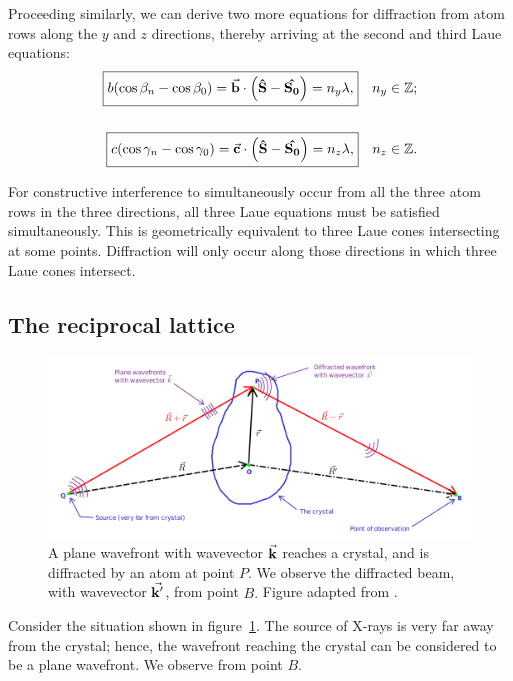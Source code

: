 	Proceeding similarly, we can derive two more equations for diffraction from atom rows along the $y$ and $z$ directions, thereby arriving at the second and third Laue equations:%
%		
	\begin{align}
	\boxed{b \qty( \cos \beta_n - \cos \beta_0 ) = \va{b} \cdot \qty( \vu{S} - \vu{S_0} ) = n_y \lambda,} \quad n_y \in \mathbb{Z}; \label{eq:2nd_laue_eqn} \\[1.5em]
	\boxed{c \qty( \cos \gamma_n - \cos \gamma_0 ) = \va{c} \cdot \qty( \vu{S} - \vu{S_0} ) = n_z \lambda,} \quad n_z \in \mathbb{Z}. \label{eq:3rd_laue_eqn}
	\end{align}
	
	For constructive interference to simultaneously occur from all the three atom rows in the three directions, all three Laue equations must be satisfied simultaneously. This is geometrically equivalent to three Laue cones intersecting at some points. Diffraction will only occur along those directions in which three Laue cones intersect.
	


\subsection{The reciprocal lattice}

	\begin{figure}
	\centering
	\includegraphics[width=\textwidth]{reciprocal_lattice.png}
	\caption{\label{fig:reciprocal_lattice}A plane wavefront with wavevector $\va{k}$ reaches a crystal, and is diffracted by an atom at point $P.$ We observe the diffracted beam, with wavevector $\va{k'}$, from point $B.$ Figure adapted from \cite{Harbola2021}.}
	\end{figure}

	Consider the situation shown in figure~\ref{fig:reciprocal_lattice}. The source of X-rays is very far away from the crystal; hence, the wavefront reaching the crystal can be considered to be a plane wavefront. We observe from point $B.$
	
